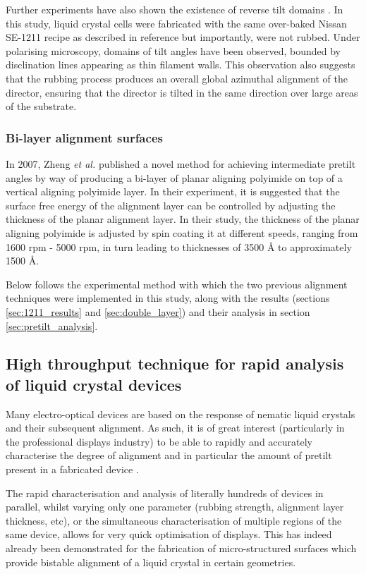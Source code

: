 Further experiments have also shown the existence of reverse tilt domains \cite{Wang2007}. In this study, liquid crystal cells were fabricated with the same over-baked Nissan SE-1211 recipe as described in reference \cite{Huang2005} but importantly, were not rubbed. Under polarising microscopy, domains of tilt angles have been observed, bounded by disclination lines appearing as thin filament walls. This observation also suggests that the rubbing process produces an overall global azimuthal alignment of the director, ensuring that the director is tilted in the same direction over large areas of the substrate.

\subsubsection{Bi-layer alignment surfaces}
In 2007, Zheng \textit{et al.} \cite{Zheng2007} published a novel method for achieving intermediate pretilt angles by way of producing a bi-layer of planar aligning polyimide on top of a vertical aligning polyimide layer. In their experiment, it is suggested that the surface free energy of the alignment layer can be controlled by adjusting the thickness of the planar alignment layer. In their study, the thickness of the planar aligning polyimide is adjusted by spin coating it at different speeds, ranging from 1600 rpm - 5000 rpm, in turn leading to thicknesses of 3500 $\text{\AA}$  to approximately 1500 \AA.

Below follows the experimental method with which the two previous alignment techniques were implemented in this study, along with the results (sections \ref{sec:1211_results} and \ref{sec:double_layer}) and their analysis in section \ref{sec:pretilt_analysis}.

\subsection{High throughput technique for rapid analysis of liquid crystal devices}
\label{camerakit}
Many electro-optical devices are based on the response of nematic liquid crystals and their subsequent alignment. As such, it is of great interest (particularly in the professional displays industry) to be able to rapidly and accurately characterise the degree of alignment and in particular the amount of pretilt present in a fabricated device \cite{Edwards2010}. 

The rapid characterisation and analysis of literally hundreds of devices in parallel, whilst varying only one parameter (rubbing strength, alignment layer thickness, etc), or the simultaneous characterisation of multiple regions of the same device, allows for very quick optimisation of displays. This has indeed already been demonstrated for the fabrication of micro-structured surfaces which provide bistable alignment of a liquid crystal \cite{Kitson2002} in certain geometries.

